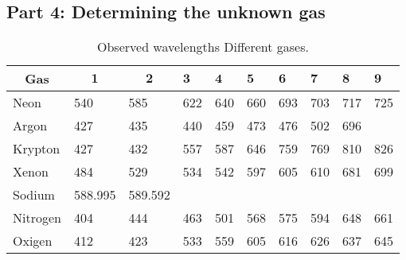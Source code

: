 \subsection{Part 4: Determining the unknown gas}


\begin{table}
    \begin{adjustbox}{width=1\textwidth, center}
        \begin{tabular}{|l|l|l|l|l|l|l|l|l|l|}
            \hline \multicolumn{1}{|c|}{ Gas } & \multicolumn{1}{|c|}{$\mathbf{1}$} & \multicolumn{1}{c|}{$\mathbf{2}$} & $\mathbf{3}$ & $\mathbf{4}$ & $\mathbf{5}$ & $\mathbf{6}$ & $\mathbf{7}$ & $\mathbf{8}$ & $\mathbf{9}$ \\
            \hline Neon                        & 540                                & 585                               & 622          & 640          & 660          & 693          & 703          & 717          & 725          \\
            \hline Argon                       & 427                                & 435                               & 440          & 459          & 473          & 476          & 502          & 696          &              \\
            \hline Krypton                     & 427                                & 432                               & 557          & 587          & 646          & 759          & 769          & 810          & 826          \\
            \hline Xenon                       & 484                                & 529                               & 534          & 542          & 597          & 605          & 610          & 681          & 699          \\
            \hline Sodium                      & 588.995                            & 589.592                           &              &              &              &              &              &              &              \\
            \hline Nitrogen                    & 404                                & 444                               & 463          & 501          & 568          & 575          & 594          & 648          & 661          \\
            \hline Oxigen                      & 412                                & 423                               & 533          & 559          & 605          & 616          & 626          & 637          & 645          \\
            \hline
        \end{tabular}
    \end{adjustbox}
    \caption{Observed wavelengths Different gases.}
\end{table}


